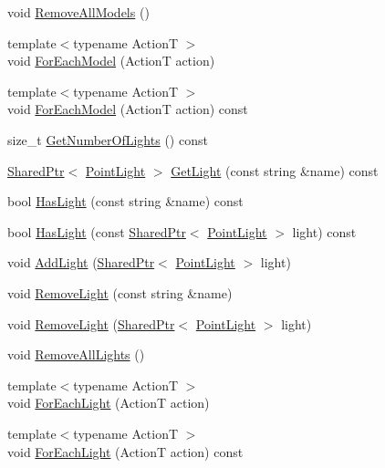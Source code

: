 \begin{DoxyCompactItemize}
\item 
void \hyperlink{classmage_1_1_world_af3bae7b62192de9edda5e0567b73be93}{Remove\+All\+Models} ()
\item 
{\footnotesize template$<$typename ActionT $>$ }\\void \hyperlink{classmage_1_1_world_af93e3b8fb6faf403bd375f38323d89be}{For\+Each\+Model} (ActionT action)
\item 
{\footnotesize template$<$typename ActionT $>$ }\\void \hyperlink{classmage_1_1_world_a8f9c130a358f6ce687d2948f477d4ef2}{For\+Each\+Model} (ActionT action) const
\item 
size\+\_\+t \hyperlink{classmage_1_1_world_a786420d8d8b97065ee591753b7f1541b}{Get\+Number\+Of\+Lights} () const
\item 
\hyperlink{namespacemage_a1e01ae66713838a7a67d30e44c67703e}{Shared\+Ptr}$<$ \hyperlink{classmage_1_1_point_light}{Point\+Light} $>$ \hyperlink{classmage_1_1_world_ac7c1a382b10e67bd42493af3966c9212}{Get\+Light} (const string \&name) const
\item 
bool \hyperlink{classmage_1_1_world_af83318e3810a5658aa37285df708aa81}{Has\+Light} (const string \&name) const
\item 
bool \hyperlink{classmage_1_1_world_ac76eb3df75c68ec28b7a9db9b0576171}{Has\+Light} (const \hyperlink{namespacemage_a1e01ae66713838a7a67d30e44c67703e}{Shared\+Ptr}$<$ \hyperlink{classmage_1_1_point_light}{Point\+Light} $>$ light) const
\item 
void \hyperlink{classmage_1_1_world_ab0c31d3113ea264fed8b8ef034047c91}{Add\+Light} (\hyperlink{namespacemage_a1e01ae66713838a7a67d30e44c67703e}{Shared\+Ptr}$<$ \hyperlink{classmage_1_1_point_light}{Point\+Light} $>$ light)
\item 
void \hyperlink{classmage_1_1_world_a06f60650aa7992f44167043d1aa2e576}{Remove\+Light} (const string \&name)
\item 
void \hyperlink{classmage_1_1_world_ab2bca0a737500b2d78b39e6cbafd61d0}{Remove\+Light} (\hyperlink{namespacemage_a1e01ae66713838a7a67d30e44c67703e}{Shared\+Ptr}$<$ \hyperlink{classmage_1_1_point_light}{Point\+Light} $>$ light)
\item 
void \hyperlink{classmage_1_1_world_a5fafe529414d511e88b98ccd8e2f951f}{Remove\+All\+Lights} ()
\item 
{\footnotesize template$<$typename ActionT $>$ }\\void \hyperlink{classmage_1_1_world_a4a95952713a717c9677dc9dd4dc82780}{For\+Each\+Light} (ActionT action)
\item 
{\footnotesize template$<$typename ActionT $>$ }\\void \hyperlink{classmage_1_1_world_a7f6e04d24be88ae3126021d1b935ef72}{For\+Each\+Light} (ActionT action) const
\end{DoxyCompactItemize}
